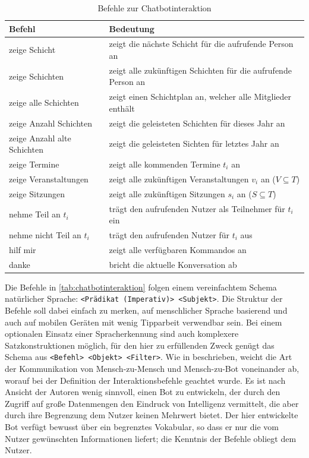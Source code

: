 \begin{table}[H]
\centering
\begin{tabular}{l|l}
  \textbf{Befehl }& \textbf{Bedeutung }\\
 \hline
 zeige Schicht & zeigt die nächste Schicht für die aufrufende Person an \\
 zeige Schichten & zeigt alle zukünftigen Schichten für die aufrufende Person an \\
 zeige alle Schichten & zeigt einen Schichtplan an, welcher alle Mitglieder enthält \\
 
 zeige Anzahl Schichten & zeigt die geleisteten Schichten für dieses Jahr an \\
 zeige Anzahl alte Schichten & zeigt die geleisteten Sichten für letztes Jahr an \\
 
 zeige Termine & zeigt alle kommenden Termine $t_i$ an \\
 zeige Veranstaltungen & zeigt alle zukünftigen Veranstaltungen $v_i$ an ($V \subseteq T$) \\
 zeige Sitzungen & zeigt alle zukünftigen Sitzungen $s_i$ an ($S \subseteq T$) \\
 
 nehme Teil an $t_i$ & trägt den aufrufenden Nutzer als Teilnehmer für $t_i$ ein \\
 nehme nicht Teil an $t_i$ & trägt den aufrufenden Nutzer für $t_i$ aus\\

 hilf mir & zeigt alle verfügbaren Kommandos an \\
 danke & bricht die aktuelle Konversation ab \\
\end{tabular}
\caption{Befehle zur Chatbotinteraktion}
\label{tab:chatbotinteraktion}
\end{table}


Die Befehle in \autoref{tab:chatbotinteraktion} folgen einem vereinfachtem Schema natürlicher Sprache: \texttt{<Prädikat (Imperativ)> <Subjekt>}. Die Struktur der Befehle soll dabei einfach zu merken, auf menschlicher Sprache basierend und auch auf mobilen Geräten mit wenig Tipparbeit verwendbar sein. Bei einem optionalen Einsatz einer Spracherkennung sind auch komplexere Satzkonstruktionen möglich, für den hier zu erfüllenden Zweck genügt das Schema aus \texttt{<Befehl> <Objekt> <Filter>}. Wie in \cite{ZueConversationalinterfacesadvances2000} beschrieben, weicht die Art der Kommunikation von Mensch-zu-Mensch und Mensch-zu-Bot voneinander ab, worauf bei der Definition der Interaktionsbefehle geachtet wurde. Es ist nach Ansicht der Autoren wenig sinnvoll, einen Bot zu entwickeln, der durch den Zugriff auf große Datenmengen den Eindruck von Intelligenz vermittelt, die aber durch ihre Begrenzung dem Nutzer keinen Mehrwert bietet. Der hier entwickelte Bot verfügt bewusst über ein begrenztes Vokabular, so dass er nur die vom Nutzer gewünschten Informationen liefert; die Kenntnis der Befehle obliegt dem Nutzer.

